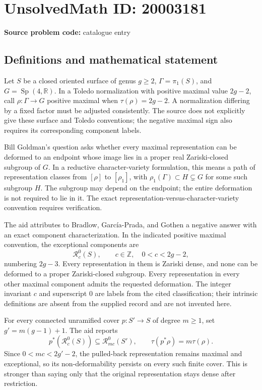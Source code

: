 \documentclass[11pt]{article}
\newcommand{\Z}{\mathbb{Z}}
\newcommand{\R}{\mathbb{R}}
\begin{document}
\section*{UnsolvedMath ID: 20003181}
\textbf{Source problem code:} catalogue entry
\subsection{Definitions and mathematical statement}
Let \(S\) be a closed oriented surface of genus \(g\geq2\), \(\Gamma=\pi_1(S)\), and \(G=\operatorname{Sp}(4,\R)\). In a Toledo normalization with positive maximal value \(2g-2\), call \(\rho:\Gamma\to G\) positive maximal when \(\tau(\rho)=2g-2\). A normalization differing by a fixed factor must be adjusted consistently. The source does not explicitly give these surface and Toledo conventions; the negative maximal sign also requires its corresponding component labels.

Bill Goldman's question asks whether every maximal representation can be deformed to an endpoint whose image lies in a proper real Zariski-closed subgroup of \(G\). In a reductive character-variety formulation, this means a path of representation classes from \([\rho]\) to \([\rho_1]\), with \(\rho_1(\Gamma)\subset H\subsetneq G\) for some such subgroup \(H\). The subgroup may depend on the endpoint; the entire deformation is not required to lie in it. The exact representation-versus-character-variety convention requires verification.

The aid attributes to Bradlow, Garc\'ia-Prada, and Gothen a negative answer with an exact component characterization. In the indicated positive maximal convention, the exceptional components are
\[
 \mathcal R_c^0(S),\qquad c\in\Z,\quad0<c<2g-2,
\]
numbering \(2g-3\). Every representation in them is Zariski dense, and none can be deformed to a proper Zariski-closed subgroup. Every representation in every other maximal component admits the requested deformation. The integer invariant \(c\) and superscript \(0\) are labels from the cited classification; their intrinsic definitions are absent from the supplied record and are not invented here.

For every connected unramified cover \(p:S'\to S\) of degree \(m\geq1\), set \(g'=m(g-1)+1\). The aid reports
\[
 p^*(\mathcal R_c^0(S))\subseteq\mathcal R_{mc}^0(S'),\qquad
 \tau(p^*\rho)=m\tau(\rho).
\]
Since \(0<mc<2g'-2\), the pulled-back representation remains maximal and exceptional, so its non-deformability persists on every such finite cover. This is stronger than saying only that the original representation stays dense after restriction.
\end{document}

